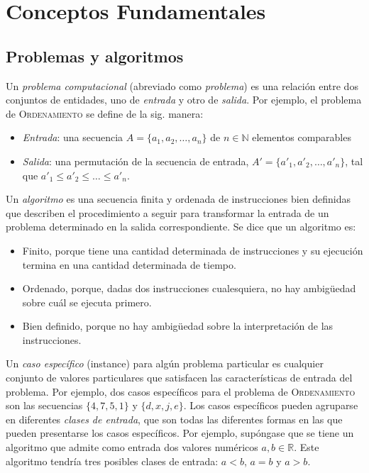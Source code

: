 
\chapter{Conceptos Fundamentales}

\section{Problemas y algoritmos}

Un \emph{problema computacional} (abreviado como \emph{problema})
es una relación entre dos conjuntos de entidades, uno de \emph{entrada}
y otro de \emph{salida}. Por ejemplo, el problema de \textsc{Ordenamiento} se
define de la sig. manera:

\begin{itemize}
    \item \emph{Entrada}: una secuencia $A=\{a_1,a_2,\dots,a_n\}$ de $n\in\mathbb{N}$ elementos comparables
    \item \emph{Salida}: una permutación de la secuencia de entrada, $A'=\{a'_1,a'_2,\dots,a'_n\}$, tal que $a'_1\leq a'_2\leq\dots\leq a'_n$.
\end{itemize}

Un \emph{algoritmo} es una secuencia finita
y ordenada de instrucciones bien definidas que describen el procedimiento
a seguir para transformar la entrada de un problema determinado en
la salida correspondiente. Se dice que un algoritmo es:

\begin{itemize}
    \item Finito, porque tiene una cantidad determinada de instrucciones y su
    ejecución termina en una cantidad determinada de tiempo.
    \item Ordenado, porque, dadas dos instrucciones cualesquiera, no hay ambigüedad
    sobre cuál se ejecuta primero.
    \item Bien definido, porque no hay ambigüedad sobre la interpretación de
    las instrucciones.
\end{itemize}

Un \emph{caso específico} (instance) para algún problema particular
es cualquier conjunto de valores particulares que satisfacen las características
de entrada del problema. Por ejemplo, dos casos específicos para el problema
de \textsc{Ordenamiento} son las secuencias $\{4,7,5,1\}$ y $\{d,x,j,e\}$. Los casos específicos pueden agruparse en
diferentes \emph{clases de entrada}, que son todas las diferentes
formas en las que pueden presentarse los casos específicos. Por ejemplo,
supóngase que se tiene un algoritmo que admite como entrada dos valores
numéricos $a,b\in\mathbb{R}$. Este algoritmo tendría tres posibles
clases de entrada: $a<b$, $a=b$ y $a>b$.

